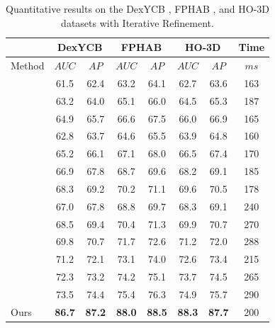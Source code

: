 \begin{table}[h]
\caption{Quantitative results on the DexYCB \cite{chao2021dexycb}, FPHAB \cite{garcia2018first}, and HO-3D \cite{hampali2020honnotate} datasets with Iterative Refinement.}
\label{tab:dataset_with_ir}
\begin{center}
\begin{tabular}{|l|c|c|c|c|c|c|c|} 
\hline
& \multicolumn{2}{c|}{DexYCB} & \multicolumn{2}{c|}{FPHAB} & \multicolumn{2}{c|}{HO-3D} & Time \\
\hline
Method & $AUC$ & $AP$ & $AUC$ & $AP$ & $AUC$ & $AP$ & $ms$ \\  
\hline 
\cite{wang20216d} & 61.5 & 62.4 & 63.2 & 64.1 & 62.7 & 63.6 & 163 \\
\cite{gao20206d} & 63.2 & 64.0 & 65.1 & 66.0 & 64.5 & 65.3 & 187 \\
\cite{guo2021efficient} & 64.9 & 65.7 & 66.6 & 67.5 & 66.0 & 66.9 & 165 \\
\hline 
\cite{billings2019silhonet} & 62.8 & 63.7 & 64.6 & 65.5 & 63.9 & 64.8 & 160 \\
\cite{peng2019pvnet} & 65.2 & 66.1 & 67.1 & 68.0 & 66.5 & 67.4 & 170 \\
\cite{wang2021gdr} & 66.9 & 67.8 & 68.7 & 69.6 & 68.2 & 69.1 & 185 \\
\cite{castro2023crt} & 68.3 & 69.2 & 70.2 & 71.1 & 69.6 & 70.5 & 178 \\
\hline
\cite{wang2019densefusion} & 67.0 & 67.8 & 68.8 & 69.7 & 68.3 & 69.1 & 240 \\
\cite{he2020pvn3d} & 68.5 & 69.4 & 70.4 & 71.3 & 69.9 & 70.7 & 270 \\
\cite{he2021ffb6d} & 69.8 & 70.7 & 71.7 & 72.6 & 71.2 & 72.0 & 288 \\
\cite{wu2023geometric} & 71.2 & 72.1 & 73.1 & 74.0 & 72.6 & 73.4 & 215 \\
\cite{hong2024rdpn6d} & 72.3 & 73.2 & 74.2 & 75.1 & 73.7 & 74.5 & 265 \\
\cite{lin2024hipose} & 73.5 & 74.4 & 75.4 & 76.3 & 74.9 & 75.7 & 290 \\
Ours & \textbf{86.7} & \textbf{87.2} & \textbf{88.0} & \textbf{88.5} & \textbf{88.3} & \textbf{87.7} & 200 \\
\hline
\end{tabular}
\end{center}
\end{table}


